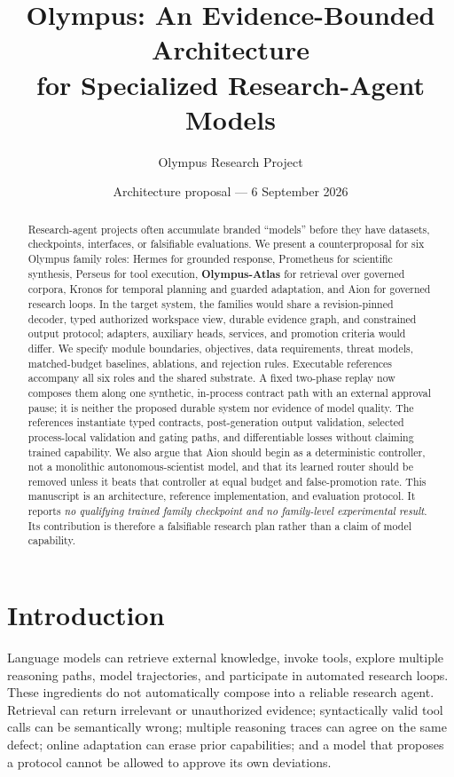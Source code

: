 \documentclass[10pt]{article}
\title{Olympus: An Evidence-Bounded Architecture\\for Specialized Research-Agent Models}
\author{Olympus Research Project}
\date{Architecture proposal --- 6 September 2026}
\newcommand{\atlas}{\textbf{Olympus-Atlas}}
\begin{document}
\maketitle

\begin{abstract}
Research-agent projects often accumulate branded ``models'' before they have
datasets, checkpoints, interfaces, or falsifiable evaluations. We present a
counterproposal for six Olympus family roles: Hermes for grounded response,
Prometheus for scientific synthesis, Perseus for tool execution,
\atlas{} for retrieval over governed corpora, Kronos for temporal planning and
guarded adaptation, and Aion for governed research loops. In the target system,
the families would share a revision-pinned decoder, typed authorized workspace
view, durable evidence graph, and constrained output protocol; adapters,
auxiliary heads, services, and promotion criteria would differ. We specify
module boundaries, objectives, data requirements, threat models, matched-budget
baselines, ablations, and rejection rules. Executable references accompany all
six roles and the shared substrate. A fixed two-phase replay now composes them
along one synthetic, in-process contract path with an external approval pause;
it is neither the proposed durable system nor evidence of model quality. The
references instantiate typed contracts, post-generation output validation,
selected process-local validation and gating paths, and differentiable losses
without claiming trained capability. We also argue
that Aion should begin as a deterministic controller, not a monolithic
autonomous-scientist model, and that its learned router should be
removed unless it beats that controller at equal budget and false-promotion
rate. This manuscript is an architecture, reference implementation, and
evaluation protocol. It reports
\emph{no qualifying trained family checkpoint and no family-level experimental
result}.
Its contribution is therefore a falsifiable research plan rather than a claim
of model capability.
\end{abstract}

\section{Introduction}

Language models can retrieve external knowledge, invoke tools, explore multiple
reasoning paths, model trajectories, and participate in automated research
loops. These ingredients do not automatically compose into a reliable research
agent. Retrieval can return irrelevant or unauthorized evidence; syntactically
valid tool calls can be semantically wrong; multiple reasoning traces can agree
on the same defect; online adaptation can erase prior capabilities; and a model
that proposes a protocol cannot be allowed to approve its own deviations.
\end{document}
